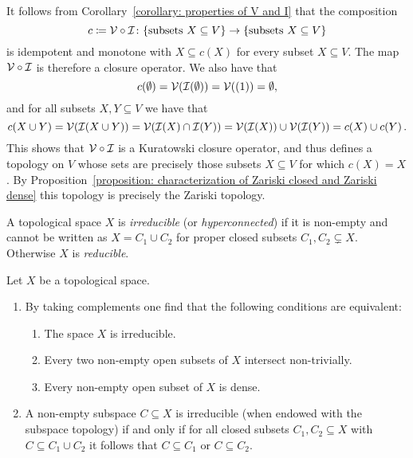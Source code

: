 \begin{remark}
  It follows from Corollary~\ref{corollary: properties of V and I} that the composition
  \[
              c
    \coloneqq  \mathcal{V} \circ \mathcal{I}
    \colon    \{ \text{subsets $X \subseteq V$} \}
    \to       \{ \text{subsets $X \subseteq V$} \}
  \]
  is idempotent and monotone with $X \subseteq c(X)$ for every subset $X \subseteq V$.
  The map $\mathcal{V} \circ \mathcal{I}$ is therefore a closure operator.
  We also have that
  \[
      c(\emptyset)
    = \mathcal{V}(\mathcal{I}(\emptyset))
    = \mathcal{V}((1))
    = \emptyset,
  \]
  and for all subsets $X, Y \subseteq V$ we have that
  \[
      c(X \cup Y)
    = \mathcal{V}(\mathcal{I}(X \cup Y))
    = \mathcal{V}(\mathcal{I}(X) \cap \mathcal{I}(Y))
    = \mathcal{V}(\mathcal{I}(X)) \cup \mathcal{V}(\mathcal{I}(Y))
    = c(X) \cup c(Y) \,.
  \]
  This shows that $\mathcal{V} \circ \mathcal{I}$ is a Kuratowski closure operator, and thus defines a topology on $V$ whose sets are precisely those subsets $X \subseteq V$ for which $c(X) = X$.
  By Proposition~\ref{proposition: characterization of Zariski closed and Zariski dense} this topology is precisely the Zariski topology.
\end{remark}


\begin{definition}
  A topological space $X$ is \emph{irreducible} (or \emph{hyperconnected}) if it is non-empty and cannot be written as $X = C_1 \cup C_2$ for proper closed subsets $C_1, C_2 \subsetneq X$.
  Otherwise $X$ is \emph{reducible}.
\end{definition}


\begin{remark}
  Let $X$ be a topological space.
  \begin{enumerate}
    \item
      By taking complements one find that the following conditions are equivalent:
      \begin{enumerate}
        \item
          The space $X$ is irreducible.
        \item
          Every two non-empty open subsets of $X$ intersect non-trivially.
        \item
          Every non-empty open subset of $X$ is dense.
      \end{enumerate}
    \item
      A non-empty subspace $C \subseteq X$ is irreducible (when endowed with the subspace topology) if and only if for all closed subsets $C_1, C_2 \subseteq X$ with $C \subseteq C_1 \cup C_2$ it follows that $C \subseteq C_1$ or $C \subseteq C_2$.
  \end{enumerate}
\end{remark}


